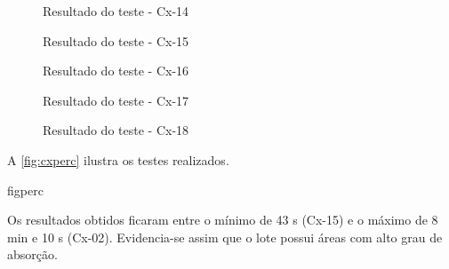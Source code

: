 \begin{figure}[htb!]\caption{Resultado do teste - Cx-14}\label{fig:cx14}\end{figure}
\begin{figure}[htb!]\caption{Resultado do teste - Cx-15}\label{fig:cx15}\end{figure}
\begin{figure}[htb!]\caption{Resultado do teste - Cx-16}\label{fig:cx16}\end{figure}
\begin{figure}[htb!]\caption{Resultado do teste - Cx-17}\label{fig:cx17}\end{figure}
\clearpage
\begin{figure}[htb!]\caption{Resultado do teste - Cx-18}\label{fig:cx18}\end{figure}


\FloatBarrier



A \cref{fig:cxperc} ilustra os testes realizados.


{figperc}



\FloatBarrier
Os resultados obtidos ficaram entre o mínimo de 43 s (Cx-15) e o 
máximo de  8 min e 10 s (Cx-02). Evidencia-se assim que o  lote possui áreas com alto grau de absorção.
